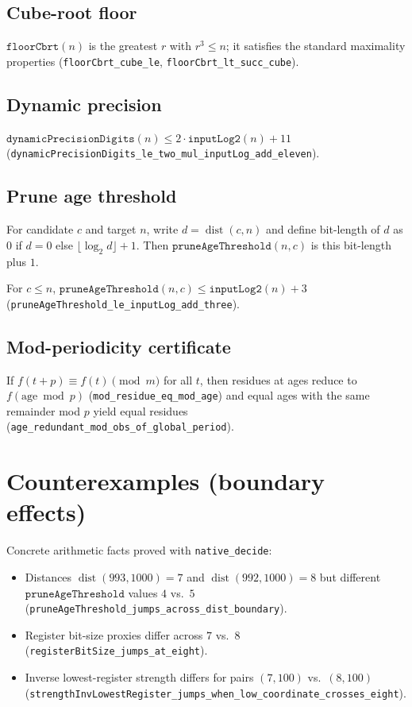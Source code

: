\documentclass[11pt,a4paper]{article}
\newcommand{\dist}{\operatorname{dist}}
\theoremstyle{plain}
\theoremstyle{definition}
\theoremstyle{remark}
\begin{document}
\subsection{Cube-root floor}

$\texttt{floorCbrt}(n)$ is the greatest $r$ with $r^3 \le n$; it satisfies the
standard maximality properties (\texttt{floorCbrt\_cube\_le}, \texttt{floorCbrt\_lt\_succ\_cube}).

\subsection{Dynamic precision}

$\texttt{dynamicPrecisionDigits}(n) \le 2\cdot \texttt{inputLog2}(n) + 11$
(\texttt{dynamicPrecisionDigits\_le\_two\_mul\_inputLog\_add\_eleven}).

\subsection{Prune age threshold}

For candidate $c$ and target $n$, write $d=\dist(c,n)$ and define bit-length of $d$ as
$0$ if $d=0$ else $\lfloor\log_2 d\rfloor+1$. Then
$\texttt{pruneAgeThreshold}(n,c)$ is this bit-length plus $1$.

For $c\le n$, $\texttt{pruneAgeThreshold}(n,c) \le \texttt{inputLog2}(n)+3$
(\texttt{pruneAgeThreshold\_le\_inputLog\_add\_three}).

\subsection{Mod-periodicity certificate}

If $f(t+p)\equiv f(t) \pmod m$ for all $t$, then residues at ages reduce to
$f(\mathrm{age}\bmod p)$ (\texttt{mod\_residue\_eq\_mod\_age}) and equal ages with the
same remainder mod $p$ yield equal residues (\texttt{age\_redundant\_mod\_obs\_of\_global\_period}).

\section{Counterexamples (boundary effects)}

Concrete arithmetic facts proved with \texttt{native\_decide}:
\begin{itemize}
\item Distances $\dist(993,1000)=7$ and $\dist(992,1000)=8$ but different
      $\texttt{pruneAgeThreshold}$ values $4$ vs.\ $5$
      (\texttt{pruneAgeThreshold\_jumps\_across\_dist\_boundary}).
\item Register bit-size proxies differ across $7$ vs.\ $8$
      (\texttt{registerBitSize\_jumps\_at\_eight}).
\item Inverse lowest-register strength differs for pairs $(7,100)$ vs.\ $(8,100)$
      (\texttt{strengthInvLowestRegister\_jumps\_when\_low\_coordinate\_crosses\_eight}).
\end{itemize}
\end{document}
